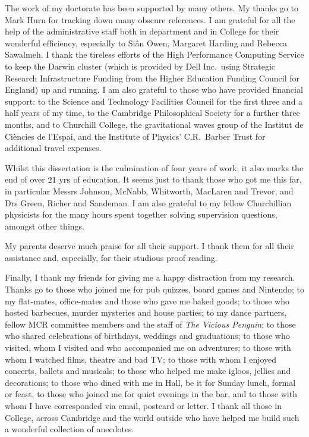 The work of my doctorate has been supported by many others. My thanks go to Mark Hurn for tracking down many obscure references. I am grateful for all the help of the administrative staff both in department and in College for their wonderful efficiency, especially to Si{\^a}n Owen, Margaret Harding and Rebecca Sawalmeh. I thank the tireless efforts of the High Performance Computing Service to keep the Darwin cluster (which is provided by Dell Inc.\ using Strategic Research Infrastructure Funding from the Higher Education Funding Council for England) up and running. I am also grateful to those who have provided financial support: to the Science and Technology Facilities Council for the first three and a half years of my time, to the Cambridge Philosophical Society for a further three months, and to Churchill College, the gravitational waves group of the Institut de Ci{\`e}ncies de l'Espai, and the Institute of Physics' C.R.\ Barber Trust for additional travel expenses.

Whilst this dissertation is the culmination of four years of work, it also marks the end of over $21~\mathrm{yrs}$ of education. It seems just to thank those who got me this far, in particular Messrs Johnson, McNabb, Whitworth, MacLaren and Trevor, and Drs Green, Richer and Sandeman. I am also grateful to my fellow Churchillian physicists for the many hours spent together solving supervision questions, amongst other things.

My parents deserve much praise for all their support. I thank them for all their assistance and, especially, for their studious proof reading.

Finally, I thank my friends for giving me a happy distraction from my research. Thanks go to those who joined me for pub quizzes, board games and Nintendo; to my flat-mates, office-mates and those who gave me baked goods; to those who hosted barbecues, murder mysteries and house parties; to my dance partners, fellow MCR committee members and the staff of \textit{The Vicious Penguin}; to those who shared celebrations of birthdays, weddings and graduations; to those who visited, whom I visited and who accompanied me on adventures; to those with whom I watched films, theatre and bad TV; to those with whom I enjoyed concerts, ballets and musicals; to those who helped me make igloos, jellies and decorations; to those who dined with me in Hall, be it for Sunday lunch, formal or feast, to those who joined me for quiet evenings in the bar, and to those with whom I have corresponded via email, postcard or letter. I thank all those in College, across Cambridge and the world outside who have helped me build such a wonderful collection of anecdotes.

